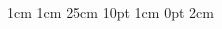 \documentclass[12pt,letterpaper]{article}
\begin{document}
\setmargins{2cm}
{1cm}
{1cm}
{25cm}
{10pt}
{1cm}
{0pt}
{2cm}

\pagebreak
\begin{multicols*}{2}
    
\end{multicols*}
\end{document}
